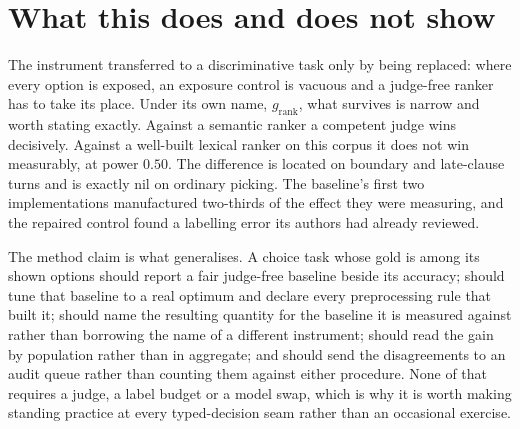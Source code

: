 \documentclass[10pt,twocolumn]{article}
\newcommand{\grank}{$g_{\mathrm{rank}}$}
\begin{document}
\section{What this does and does not show}\label{sec:conclusion}
The instrument transferred to a discriminative task only by being replaced: where every
option is exposed, an exposure control is vacuous and a judge-free ranker has to take its
place. Under its own name, \grank{}, what survives is narrow and worth stating exactly.
Against a semantic ranker a competent judge wins decisively. Against a well-built lexical
ranker on this corpus it does not win measurably, at power $0.50$. The difference is located
on boundary and late-clause turns and is exactly nil on ordinary picking. The baseline's first
two implementations manufactured two-thirds of the effect they were measuring, and the
repaired control found a labelling error its authors had already reviewed.

The method claim is what generalises. A choice task whose gold is among its shown options
should report a fair judge-free baseline beside its accuracy; should tune that baseline to a
real optimum and declare every preprocessing rule that built it; should name the resulting
quantity for the baseline it is measured against rather than borrowing the name of a different
instrument; should read the gain by population rather than in aggregate; and should send the
disagreements to an audit queue rather than counting them against either procedure. None of
that requires a judge, a label budget or a model swap, which is why it is worth making
standing practice at every typed-decision seam rather than an occasional exercise.

\printbibliography
\end{document}

